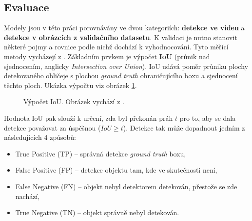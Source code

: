\subsection*{Evaluace}
Modely jsou v této práci porovnávány ve dvou kategoriích: \textbf{detekce ve videu} a \textbf{detekce v obrázcích z validačního datasetu}. K validaci je nutno stanovit některé pojmy a rovnice podle nichž dochází k vyhodnocování. Tyto měřící metody vycházejí z \cite{detekceMetriky}. Základním prvkem je výpočet \textbf{IoU} (průnik nad sjednocením, anglicky \emph{Intersection over Union}). IoU udává poměr průniku plochy detekovaného obličeje s plochou \emph{ground truth} ohraničujícího boxu a sjednocení těchto ploch. Ukázka výpočtu viz obrázek \ref{obrazek:iou}.

\begin{figure}[H] 
  \begin{center}
  \label{obrazek:iou}
  \caption{Výpočet IoU. Obrázek vychází z \cite{detekceMetriky}.}
  \end{center}
\end{figure}

Hodnota IoU pak slouží k určení, zda byl překonán práh $t$ pro to, aby se dala detekce považovat za úspěšnou ($IoU \ge t$). Detekce tak může dopadnout jedním z následujících 4 způsobů:

\begin{itemize}
  \item True Positive (TP) -- správná detekce \emph{ground truth} boxu,
  \item False Positive (FP) -- detekce objektu tam, kde ve skutečnosti není,
  \item False Negative (FN) -- objekt nebyl detektorem detekován, přestože se zde nachází,
  \item True Negative (TN) -- objekt správně nebyl detekován.
\end{itemize}

